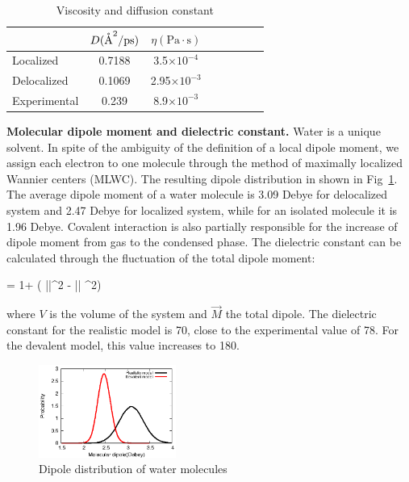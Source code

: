 \documentclass[prl,twocolumn,showpacs]{revtex4}
\begin{document}
\begin{table}
\caption{Viscosity and diffusion constant}\label{Tab:dfs}
\begin{tabular}{l*{6}{c}r}
\hline
               & $D(\mathring{\text{A}}^2/\text{ps})$ & $\eta(\text{Pa}\cdot \text{s})$ \\
\hline
Localized                & 0.7188 & 3.5$\times 10^{-4}$ \\

Delocalized              & 0.1069 & 2.95$\times 10^{-3}$\\

Experimental            & 0.239  & 8.9$\times 10^{-3} $


\end{tabular}

\end{table}
 

\textbf{Molecular dipole moment and dielectric constant.} Water is a unique solvent. In spite of the ambiguity of the definition of a local dipole moment, we assign each electron to one molecule through the method of maximally localized Wannier centers (MLWC). The resulting dipole distribution in shown in Fig~\ref{Fig:dipoledist}. The average dipole moment of a water molecule is 3.09 Debye for delocalized system and 2.47 Debye for localized system, while for an isolated molecule it is 1.96 Debye. \new Covalent interaction is also partially responsible for the increase of dipole moment from gas to the condensed phase. \old The dielectric constant can be calculated through the fluctuation of the total dipole moment\cite{neumann1983dipole,adams1981theory}:

\bea
\epsilon = 1+  (  \langle ||^2 \rangle  - \langle || \rangle ^2) \label{Eq:dielectric}
\eea

where $V$ is the volume of the system and $\vec{M}$ the total dipole. The dielectric constant for the realistic model is 70, close to the experimental value of 78. For the devalent model, this value increases to 180.

\begin{figure}
\includegraphics[width=0.4\textwidth]{new_dipole}
\caption{Dipole distribution of water molecules} \label{Fig:dipoledist}
\end{figure}
\end{document}
